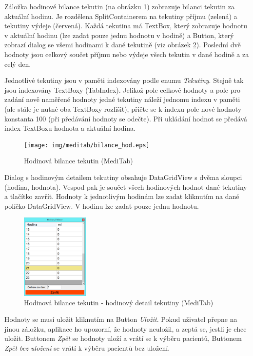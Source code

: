 Záložka hodinové bilance tekutin (na obrázku \ref{fig:bilance_hod}) zobrazuje bilanci tekutin za aktuální hodinu. Je rozdělena SplitContainerem na tekutiny příjmu (zelená) a tekutiny výdeje (červená). Každá tekutina má TextBox, který zobrazuje hodnotu v aktuální hodinu (lze zadat pouze jednu hodnotu v hodině) a Button, který zobrazí dialog se všemi hodinami k dané tekutině (viz obrázek \ref{fig:bilance_hod_detail}). Poslední dvě hodnoty jsou celkový součet příjmu nebo výdeje všech tekutin v dané hodině a za celý den.

Jednotlivé tekutiny jsou v paměti indexovány podle enumu \emph{Tekutiny}. Stejně tak jsou indexovány TextBoxy (TabIndex). Jelikož pole celkové hodnoty a pole pro zadání nově naměřené hodnoty jedné tekutiny náleží jednomu indexu v paměti (ale stále je nutné oba TextBoxy rozlišit), přičte se k indexu pole nové hodnoty konstanta 100 (při předávání hodnoty se odečte). Při ukládání hodnot se předává index TextBoxu hodnota a aktuální hodina.

\begin{figure}[H]
	\centering
	\texttt{[image: img/meditab/bilance\_hod.eps]}
	\caption{Hodinová bilance tekutin (MediTab)}
  \label{fig:bilance_hod}
\end{figure}

Dialog s hodinovým detailem tekutiny obsahuje DataGridView s dvěma sloupci (hodina, hodnota). Vespod pak je součet všech hodinových hodnot dané tekutiny a tlačítko zavřít. Hodnoty k jednotlivým hodinám lze zadat kliknutím na dané políčko DataGridView. V hodinu lze zadat pouze jednu hodnotu.

\begin{figure}[H]
	\centering
	\includegraphics[width=0.3\textwidth]{img/meditab/bilance_hod_detail.eps}
	\caption{Hodinová bilance tekutin - hodinový detail tekutiny (MediTab)}
  \label{fig:bilance_hod_detail}
\end{figure}

Hodnoty se musí uložit kliknutím na Button \emph{Uložit}. Pokud uživatel přepne na jinou záložku, aplikace ho upozorní, že hodnoty neuložil, a zeptá se, jestli je chce uložit. Buttonem \emph{Zpět} se hodnoty uloží a vrátí se k výběru pacientů, Buttonem \emph{Zpět bez uložení} se vrátí k výběru pacientů bez uložení.


